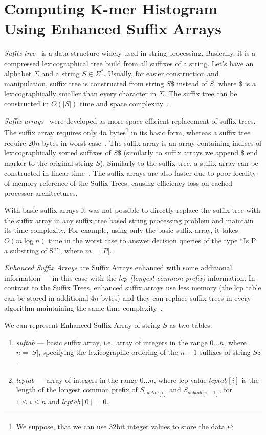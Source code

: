 \section[Enhanced Suffix Arrays]{Computing K-mer Histogram Using Enhanced Suffix Arrays}

\emph{Suffix tree}~\cite{suffixtree} is a data structure widely used in string processing. Basically, it is a compressed lexicographical tree build from all suffixes of a string. Let's have an alphabet $\Sigma$ and a string $S \in \Sigma^*$. Usually, for easier construction and manipulation, suffix tree is constructed from string $S\$$ instead of $S$, where $\$$ is a lexicographically smaller than every character in $\Sigma$. The suffix tree can be constructed in $O(|S|)$ time and space complexity~\cite{suffixtree}.

\emph{Suffix arrays}~\cite{suffixarray} were developed as more space efficient replacement of suffix trees. The suffix array requires only $4n$ bytes\footnote{We suppose, that we can use 32bit integer values to store the data.} in its basic form, whereas a suffix tree require $20n$ bytes in worst case~\cite{kurtz1999reducing}. The suffix array is an array containing indices of lexicographically sorted suffixes of $S\$$ (similarly to suffix arrays we append $\$$ end marker to the original string $S$). Similarly to the suffix tree, a suffix array can be constructed in linear time~\cite{karkkainen2003simple, kim2003linear, ko2003space}. The suffix arrays are also faster due to poor locality of memory reference of the Suffix Trees, causing efficiency loss on cached processor architectures.

With basic suffix arrays it was not possible to directly replace the suffix tree with the suffix array in any suffix tree based string processing problem and maintain its time complexity. For example, using only the basic suffix array, it takes $O(m \log n)$ time in the worst case to answer decision queries of the type ``Is P a substring of S?'', where $m = |P|$.

\emph{Enhanced Suffix Arrays} are Suffix Arrays enhanced with some additional information --- in this case with the \emph{lcp (longest common prefix)} information.
In contrast to the Suffix Trees, enhanced suffix arrays use less memory (the lcp table can be stored in additional $4n$ bytes) and they can replace suffix trees in every algorithm maintaining the same time complexity~\cite{enhancedsuffixarrays}.

We can represent Enhanced Suffix Array of string $S$ as two tables:
\begin{enumerate}
  \item \emph{suftab} --- basic suffix array, i.e.\ array of integers in the range $0\dots n$, where $n = |S|$, specifying the lexicographic ordering of the $n + 1$ suffixes of string $S\$ $.
  \item \emph{lcptab} --- array of integers in the range $0\dots n$, where lcp-value $lcptab[i]$ is the length of the longest common prefix of $S_{subtab[i]}$ and $S_{subtab[i-1]}$, for $1 \leq i \leq n$ and $lcptab[0] = 0$.
\end{enumerate}


